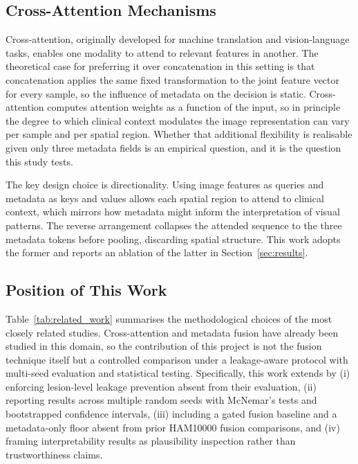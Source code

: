 \documentclass[conference]{IEEEtran}
\begin{document}
\subsection{Cross-Attention Mechanisms}

Cross-attention, originally developed for machine translation and vision-language tasks, enables one modality to attend to relevant features in another. The theoretical case for preferring it over concatenation in this setting is that concatenation applies the same fixed transformation to the joint feature vector for every sample, so the influence of metadata on the decision is static. Cross-attention computes attention weights as a function of the input, so in principle the degree to which clinical context modulates the image representation can vary per sample and per spatial region. Whether that additional flexibility is realisable given only three metadata fields is an empirical question, and it is the question this study tests.

The key design choice is directionality. Using image features as queries and metadata as keys and values allows each spatial region to attend to clinical context, which mirrors how metadata might inform the interpretation of visual patterns. The reverse arrangement collapses the attended sequence to the three metadata tokens before pooling, discarding spatial structure. This work adopts the former and reports an ablation of the latter in Section~\ref{sec:results}.

\subsection{Position of This Work}

Table~\ref{tab:related_work} summarises the methodological choices of the most closely related studies. Cross-attention and metadata fusion have already been studied in this domain, so the contribution of this project is not the fusion technique itself but a controlled comparison under a leakage-aware protocol with multi-seed evaluation and statistical testing. Specifically, this work extends \citet{das2025comparative} by (i) enforcing lesion-level leakage prevention absent from their evaluation, (ii) reporting results across multiple random seeds with McNemar's tests and bootstrapped confidence intervals, (iii) including a gated fusion baseline and a metadata-only floor absent from prior HAM10000 fusion comparisons, and (iv) framing interpretability results as plausibility inspection rather than trustworthiness claims.
\end{document}
